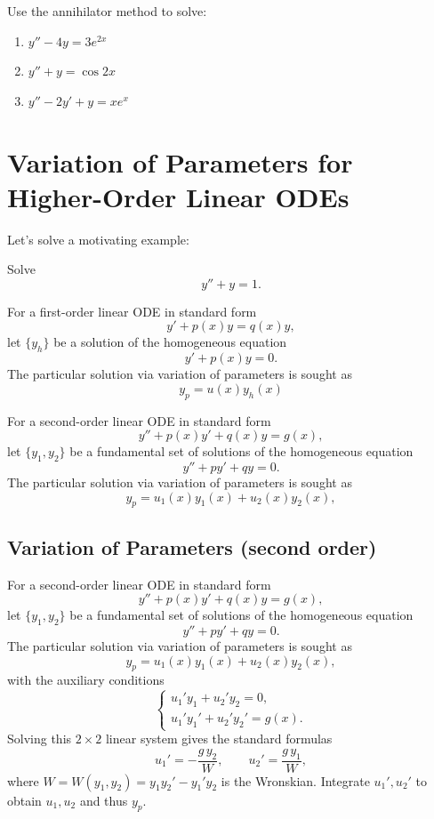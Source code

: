   \begin{question}
  Use the annihilator method to solve:
  \begin{enumerate}
      \item $y''-4y=3e^{2x}$
      \item $y''+y=\cos 2x$
      \item $y''-2y'+y = x e^x$
  \end{enumerate}
  \end{question}






\section{Variation of Parameters for Higher-Order Linear ODEs}
  \begin{example}
    Let's solve a motivating example:

    Solve
    \[
      y''+y=1.
    \]

    For a first-order linear ODE in standard form
    \[
      y' + p(x)y = q(x)y,
    \]
    let $\{y_h\}$ be a solution of the homogeneous equation 
    \[y' + p(x)y = 0.\] 
    The particular solution via variation of parameters is sought as
    \[
      y_p = u(x)y_h(x)
    \]

    For a second-order linear ODE in standard form
    \[
      y''+p(x)y'+q(x)y=g(x),
    \]
    let $\{y_1,y_2\}$ be a fundamental set of solutions of the homogeneous equation 
    \[y''+p y'+q y=0.\] 
    The particular solution via variation of parameters is sought as
    \[
      y_p = u_1(x)y_1(x) + u_2(x)y_2(x),
    \]
  \end{example}



  \subsection*{Variation of Parameters (second order)}
    For a second-order linear ODE in standard form
    \[
      y''+p(x)y'+q(x)y=g(x),
    \]
    let $\{y_1,y_2\}$ be a fundamental set of solutions of the homogeneous equation 
    \[y''+p y'+q y=0.\] 
    The particular solution via variation of parameters is sought as
    \[
      y_p = u_1(x)y_1(x) + u_2(x)y_2(x),
    \]
    with the auxiliary conditions
    \[
      \begin{cases}
        u_1' y_1 + u_2' y_2 = 0,\\[4pt]
        u_1' y_1' + u_2' y_2' = g(x).
      \end{cases}
    \]
    Solving this $2\times2$ linear system gives the standard formulas
    \[
      u_1' = -\frac{g\,y_2}{W},\qquad u_2'=\frac{g\,y_1}{W},
    \]
    where $W=W(y_1,y_2)=y_1y_2'-y_1'y_2$ is the Wronskian.
    Integrate $u_1',u_2'$ to obtain $u_1,u_2$ and thus $y_p$.

